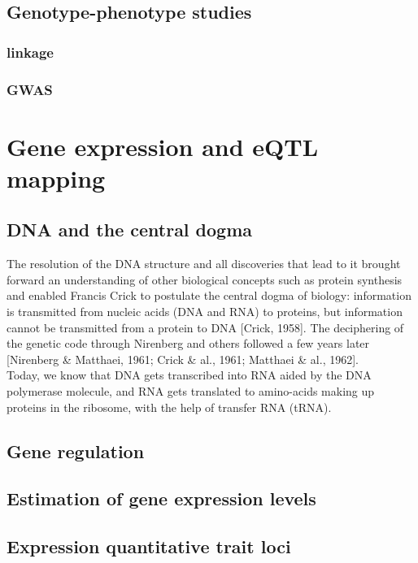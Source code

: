 \subsection{Genotype-phenotype studies}
\subsubsection{linkage}
\subsubsection{GWAS}

\section{Gene expression and eQTL mapping}  %

\subsection{DNA and the central dogma}
The resolution of the DNA structure and all discoveries that lead to it brought forward an understanding of other biological concepts such as protein synthesis and enabled Francis Crick to postulate the central dogma of biology: information is transmitted from nucleic acids (DNA and RNA) to proteins, but information cannot be transmitted from a protein to DNA [Crick, 1958]. 
The deciphering of the genetic code through Nirenberg and others followed a few years later [Nirenberg \& Matthaei, 1961; Crick \& al., 1961; Matthaei \& al., 1962].\\

Today, we know that DNA gets transcribed into RNA aided by the DNA polymerase molecule, and RNA gets translated to amino-acids making up proteins in the ribosome, with the help of transfer RNA (tRNA).

\subsection{Gene regulation}
\subsection{Estimation of gene expression levels}
\subsection{Expression quantitative trait loci}


